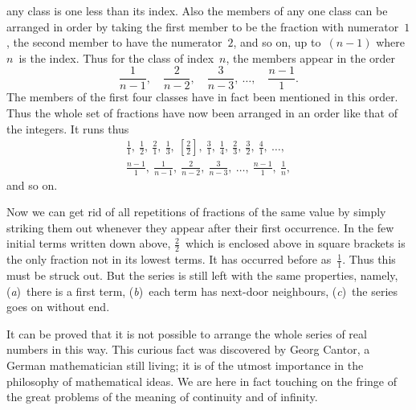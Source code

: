 \documentclass[12pt,leqno]{book}[2005/09/16]
\newcommand{\Typo}[2]{#2}
\newcommand{\PageSep}[1]{\ignorespaces}
\begin{document}
any class is one less than its index. Also the
members of any one class can be arranged
in order by taking the first member to be the
fraction with numerator~$1$, the second member
to have the numerator~$2$, and so on, up to~$(n - 1)$
where $n$~is the index. Thus for the
class of index~$n$, the members appear in the
order\Typo{.}{}
\[
\frac{1}{n - 1},\quad
\frac{2}{n - 2},\quad
\frac{3}{n - 3},\
\dots,\quad
\frac{n - 1}{1}.
\]
The members
of the first four classes have in fact been
mentioned in this order. Thus the whole set
of fractions have now been arranged in an
order like that of the integers. It runs thus
\begin{gather*}
\frac{1}{1},\
\frac{1}{2},\
\frac{2}{1},\
\frac{1}{3},\
\left[\frac{2}{2}\right],\
\frac{3}{1},\
\frac{1}{4},\
\frac{2}{3},\
\frac{3}{2},\
\frac{4}{1},\  \dots, \\
\frac{n - 1}{1},\
\frac{1}{n - 1},\
\frac{2}{n - 2},\
\frac{3}{n - 3},\
\dots,\
\frac{n - 1}{1},\
\frac{1}{n},
\end{gather*}
and so on.

Now we can get rid of all repetitions of
fractions of the same value by simply striking
them out whenever they appear after their
first occurrence. In the few initial terms
written down above, $\frac{2}{2}$~which is enclosed above
in square brackets is the only fraction not in
its lowest terms. It has occurred before as~$\frac{1}{1}$.
Thus this must be struck out. But the
series is still left with the same properties,
namely, (\textit{a})~there is a first term, (\textit{b})~each term
has next-door neighbours, (\textit{c})~the series goes
on without end.

It can be proved that it is not possible to
%
arrange the whole series of real numbers in
this way. This curious fact was discovered
by Georg Cantor, a German mathematician
still living; it is of the utmost importance
in the philosophy of mathematical ideas. We
are here in fact touching on the fringe of the
great problems of the meaning of continuity
and of infinity.
\end{document}
